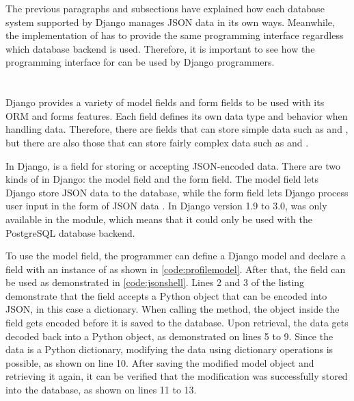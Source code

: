 The previous paragraphs and subsections have explained how each database
system supported by Django manages JSON data in its own ways. Meanwhile, the
implementation of  has to provide the same programming
interface regardless which database backend is used. Therefore, it is important
to see how the programming interface for  can be used by Django
programmers.

\section{}

Django provides a variety of model fields and form fields to be used with its
ORM and forms features. Each field defines its own data type and behavior when
handling data. Therefore, there are fields that can store simple data such as
 and , but there are also those that can
store fairly complex data such as  and .

In Django,  is a field for storing or accepting JSON-encoded
data. There are two kinds of  in Django: the model field and
the form field. The model field lets Django store JSON data to the database,
while the form field lets Django process user input in the form of JSON data
\cite{django30_modeljsonfield, django30_formjsonfield}. In Django version
1.9 to 3.0,  was only available in the
 module, which means that it could only be used
with the PostgreSQL database backend.



\noindent
\begin{minipage}{\linewidth}

\end{minipage}

To use the  model field, the programmer can define a Django
model and declare a field with an instance of  as shown in
\autoref{code:profilemodel}. After that, the field can be used as demonstrated
in \autoref{code:jsonshell}. Lines 2 and 3 of the listing demonstrate that the
field accepts a Python object that can be encoded into JSON, in this case a
dictionary. When calling the  method, the object inside the
field gets encoded before it is saved to the database. Upon retrieval, the
data gets decoded back into a Python object, as demonstrated on lines 5 to 9.
Since the data is a Python dictionary, modifying the data using dictionary
operations is possible, as shown on line 10. After saving the modified model
object and retrieving it again, it can be verified that the modification was
successfully stored into the database, as shown on lines 11 to 13.

